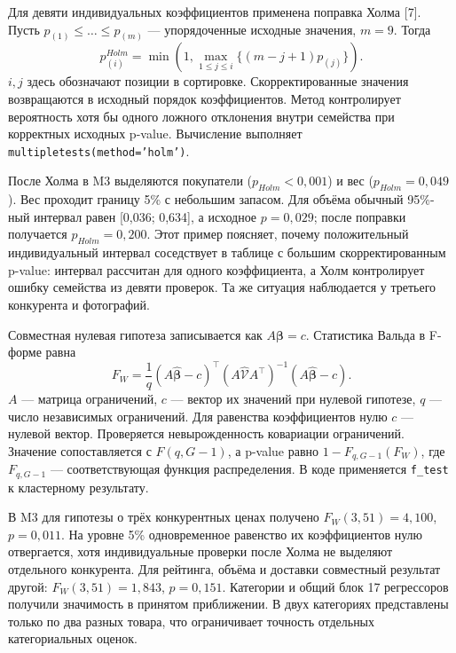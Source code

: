 \documentclass[14pt,a4paper]{extreport}
\newcommand{\resulttable}[3]{%
\begin{table}[htbp]\centering\small\singlespacing
\caption{#2}\label{#3}
\end{table}}
\begin{document}
Для девяти индивидуальных коэффициентов применена поправка Холма [7]. Пусть $p_{(1)}\leq\dots\leq p_{(m)}$ --- упорядоченные исходные значения, $m=9$. Тогда
\begin{equation}
 p^{Holm}_{(i)}=\min\left(1,\max_{1\leq j\leq i}\{(m-j+1)p_{(j)}\}\right).
\end{equation}
$i,j$ здесь обозначают позиции в сортировке. Скорректированные значения возвращаются в исходный порядок коэффициентов. Метод контролирует вероятность хотя бы одного ложного отклонения внутри семейства при корректных исходных p-value. Вычисление выполняет \texttt{multipletests(method='holm')}.
\resulttable{coefficients}{Коэффициенты M3: кластерные ошибки, p-value и индивидуальные интервалы}{tab:coefficients}

После Холма в M3 выделяются покупатели ($p_{Holm}<0{,}001$) и вес ($p_{Holm}=0{,}049$). Вес проходит границу 5\% с небольшим запасом. Для объёма обычный 95\%-ный интервал равен [0,036; 0,634], а исходное $p=0{,}029$; после поправки получается $p_{Holm}=0{,}200$. Этот пример поясняет, почему положительный индивидуальный интервал соседствует в таблице с большим скорректированным p-value: интервал рассчитан для одного коэффициента, а Холм контролирует ошибку семейства из девяти проверок. Та же ситуация наблюдается у третьего конкурента и фотографий.

Совместная нулевая гипотеза записывается как $A\boldsymbol\beta=c$. Статистика Вальда в F-форме равна
\begin{equation}
 F_W=\frac{1}{q}(A\widehat{\boldsymbol\beta}-c)^\top
 (A\widehat{\mathcal V}A^\top)^{-1}(A\widehat{\boldsymbol\beta}-c).
\end{equation}
$A$ --- матрица ограничений, $c$ --- вектор их значений при нулевой гипотезе, $q$ --- число независимых ограничений. Для равенства коэффициентов нулю $c$ --- нулевой вектор. Проверяется невырожденность ковариации ограничений. Значение сопоставляется с $F(q,G-1)$, а p-value равно $1-F_{q,G-1}(F_W)$, где $F_{q,G-1}$ --- соответствующая функция распределения. В коде применяется \texttt{f\_test} к кластерному результату.
\resulttable{tests}{Совместные проверки и проверка кривизны}{tab:tests}

В M3 для гипотезы о трёх конкурентных ценах получено $F_W(3,51)=4{,}100$, $p=0{,}011$. На уровне 5\% одновременное равенство их коэффициентов нулю отвергается, хотя индивидуальные проверки после Холма не выделяют отдельного конкурента. Для рейтинга, объёма и доставки совместный результат другой: $F_W(3,51)=1{,}843$, $p=0{,}151$. Категории и общий блок 17 регрессоров получили значимость в принятом приближении. В двух категориях представлены только по два разных товара, что ограничивает точность отдельных категориальных оценок.
\end{document}

